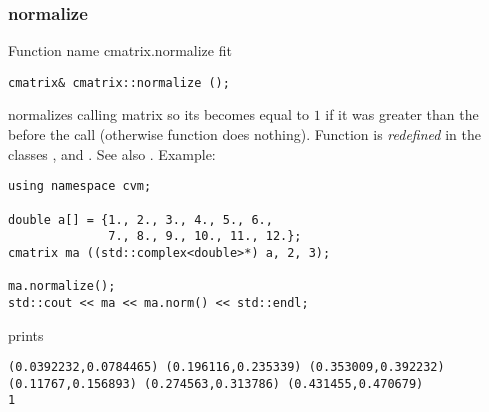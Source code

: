 \subsubsection{normalize}
Function%
\pdfdest name {cmatrix.normalize} fit
\begin{verbatim}
cmatrix& cmatrix::normalize ();
\end{verbatim}
normalizes  calling matrix so its 
becomes equal to $1$ if it was greater than the 
before the call (otherwise  function does nothing).
Function is \emph{redefined} in the classes
,  
and .
See also .
Example:
\begin{Verbatim}
using namespace cvm;

double a[] = {1., 2., 3., 4., 5., 6.,
              7., 8., 9., 10., 11., 12.};
cmatrix ma ((std::complex<double>*) a, 2, 3);

ma.normalize();
std::cout << ma << ma.norm() << std::endl;
\end{Verbatim}
prints
\begin{Verbatim}
(0.0392232,0.0784465) (0.196116,0.235339) (0.353009,0.392232)
(0.11767,0.156893) (0.274563,0.313786) (0.431455,0.470679)
1
\end{Verbatim}
\newpage



